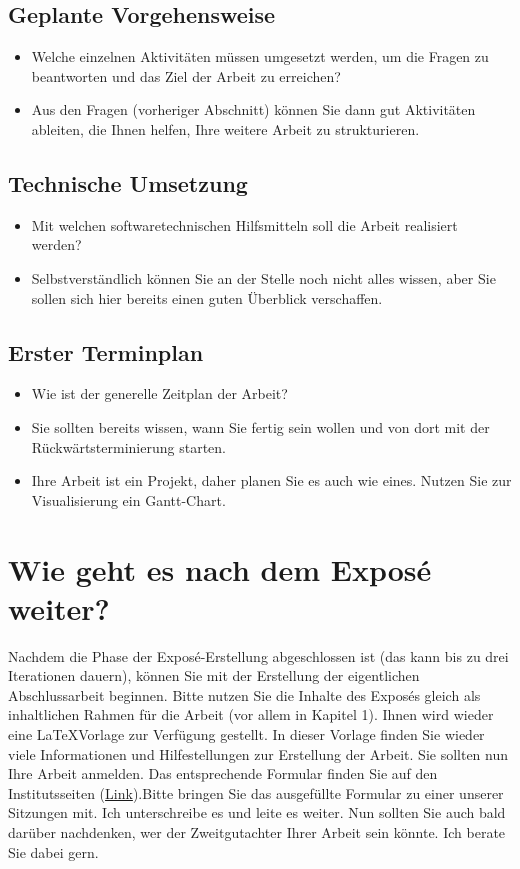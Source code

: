 \documentclass[pdftex,a4paper,12pt]{scrartcl}
\begin{document}
\subsection{Geplante Vorgehensweise}
\begin{itemize}
	\item Welche einzelnen Aktivitäten müssen umgesetzt werden, um die Fragen zu beantworten und das Ziel der Arbeit zu erreichen?
	\item Aus den Fragen (vorheriger Abschnitt) können Sie dann gut Aktivitäten ableiten, die Ihnen helfen, Ihre weitere Arbeit zu strukturieren.
\end{itemize}

\subsection{Technische Umsetzung}
\begin{itemize}
	\item Mit welchen softwaretechnischen Hilfsmitteln soll die Arbeit realisiert werden?
	\item Selbstverständlich können Sie an der Stelle noch nicht alles wissen, aber Sie sollen sich hier bereits einen guten Überblick verschaffen.
\end{itemize}

\subsection{Erster Terminplan}
\begin{itemize}
	\item Wie ist der generelle Zeitplan der Arbeit? 
	\item Sie sollten bereits wissen, wann Sie fertig sein wollen und von dort mit der Rückwärtsterminierung starten.
	\item Ihre Arbeit ist ein Projekt, daher planen Sie es auch wie eines. Nutzen Sie zur Visualisierung ein Gantt-Chart.
\end{itemize}

\section{Wie geht es nach dem Exposé weiter?}

Nachdem die Phase der Exposé-Erstellung abgeschlossen ist (das kann bis zu drei Iterationen dauern), können Sie mit der Erstellung der eigentlichen Abschlussarbeit beginnen. Bitte nutzen Sie die Inhalte des Exposés gleich als inhaltlichen Rahmen für die Arbeit (vor allem in Kapitel 1). Ihnen wird wieder eine \LaTeX Vorlage zur Verfügung gestellt. In dieser Vorlage finden Sie wieder viele Informationen und Hilfestellungen zur Erstellung der Arbeit. Sie sollten nun Ihre Arbeit anmelden. Das entsprechende Formular finden Sie auf den Institutsseiten (\href{http://www.mi.fu-berlin.de/inf/stud-bioinf/downloads/Anmeldung_zur_Bachelorarbeit_2010.pdf}{Link}).Bitte bringen Sie das ausgefüllte Formular zu einer unserer Sitzungen mit. Ich unterschreibe es und leite es weiter. Nun sollten Sie auch bald darüber nachdenken, wer der Zweitgutachter Ihrer Arbeit sein könnte. Ich berate Sie dabei gern. 
\end{document}
